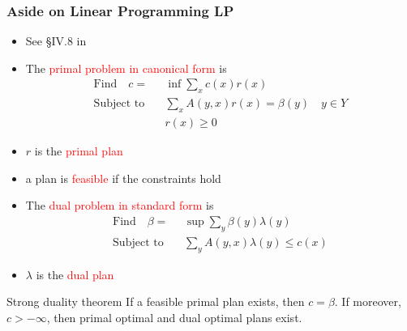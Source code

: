 \documentclass[xcolor=svgnames]{beamer}
\newcommand{\rosso}[1]{\textcolor{red}{#1}}
\renewcommand{\emph}{\rosso}
\begin{document}
\begin{frame}\small\frametitle{Aside on Linear Programming LP}

\begin{itemize}  \item See \S IV.8 in 
\end{itemize}

  \begin{itemize}
  \item The \emph{primal problem in canonical form} is
    \begin{align*}
      \text{Find} \quad c =& \inf \sum_x c(x) r(x) \\
      \text{Subject to} \quad &\sum_x A(y,x) r(x) = \beta(y) \quad y \in Y \\
      &r(x) \geq 0
    \end{align*}
  \item $r$ is the \emph{primal plan}
  \item a plan is \emph{feasible} if the constraints hold
  \end{itemize}

  \begin{itemize}
  \item The \emph{dual problem in standard form} is
    \begin{align*}
      \text{Find} \quad \beta =& \sup \sum_y \beta(y) \lambda(y) \\
      \text{Subject to} \quad &\sum_y A(y,x) \lambda(y) \leq c(x) 
    \end{align*}
  \item $\lambda$ is the \emph{dual plan}
  \end{itemize}

  \begin{block}{Strong duality theorem}
  If a feasible primal plan exists, then $c = \beta$. If moreover, $c > -\infty$, then primal optimal and dual optimal plans exist.  
  \end{block}
\end{frame}
\end{document}

